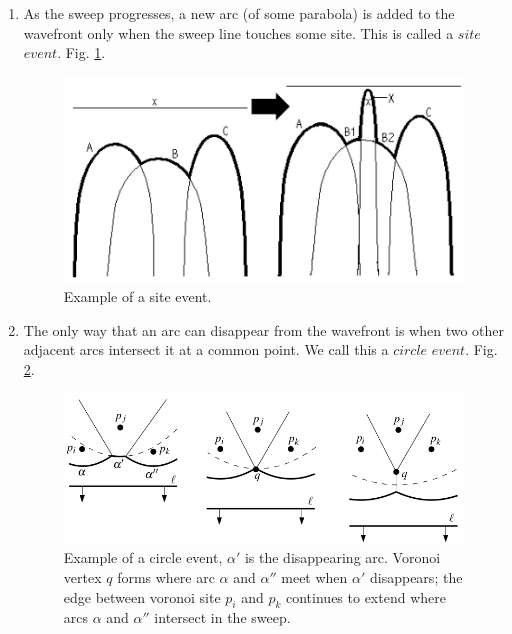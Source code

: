 \documentclass[12pt]{article}
\begin{document}
        \begin{enumerate}
        \item As the sweep progresses, a new arc (of some parabola) is added to the
        wavefront only when the sweep line touches some site.  This is called a 
        $site$ $event$. Fig. \ref{figure.siteevent}.

        \begin{figure}[h]
            \centering
            \includegraphics[width=1\textwidth]{fig7.png}
            \caption{Example of a site event.}
            \label{figure.siteevent}
        \end{figure}

        \item The only way that an arc can disappear from the wavefront is when two 
        other adjacent arcs intersect it at a common point.  We call this a 
        $circle$ $event$. Fig. \ref{figure.circleevent}.

        \begin{figure}[h]
            \centering
            \includegraphics[width=1\textwidth]{removearc.png}
            \caption{Example of a circle event, $\alpha'$ is the disappearing arc. Voronoi vertex $q$ forms where arc $\alpha$ and $\alpha''$ meet when $\alpha'$ disappears; the edge between voronoi site $p_i$ and $p_k$ continues to extend where arcs $\alpha$ and $\alpha''$ intersect in the sweep.}
            \label{figure.circleevent}
        \end{figure}
        \end{enumerate}
\end{document}
